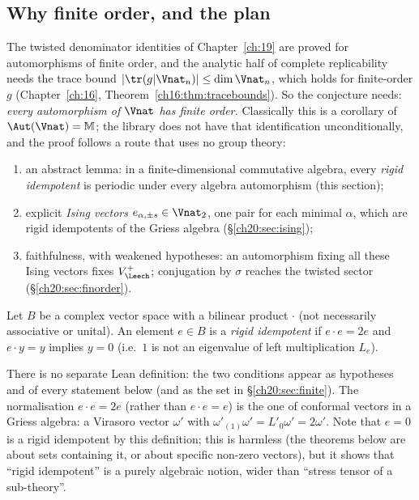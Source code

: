 \subsection{Why finite order, and the plan}

The twisted denominator identities of Chapter~\ref{ch:19} are proved for automorphisms of finite order, and the
analytic half of complete replicability needs the trace bound $|\tr(g|\Vnat_n)|\le\dim\Vnat_n$, which holds for
finite-order $g$ (Chapter~\ref{ch:16}, Theorem~\ref{ch16:thm:tracebounds}).  So the conjecture needs: \emph{every
automorphism of $\Vnat$ has finite order.}  Classically this is a corollary of $\Aut(\Vnat)=\mathbb M$; the library
does not have that identification unconditionally, and the proof follows a route that uses no group theory:
\begin{enumerate}[label=(\arabic*)]
\item an abstract lemma: in a finite-dimensional commutative algebra, every \emph{rigid idempotent} is periodic under
  every algebra automorphism (this section);
\item explicit \emph{Ising vectors} $e_{\alpha,\pm s}\in\Vnat_2$, one pair for each minimal $\alpha$, which are rigid
  idempotents of the Griess algebra (\S\ref{ch20:sec:ising});
\item faithfulness, with weakened hypotheses: an automorphism fixing all these Ising vectors fixes $\chtwentyVL$; conjugation
  by $\sigma$ reaches the twisted sector (\S\ref{ch20:sec:finorder}).
\end{enumerate}

\begin{definition}\label{ch20:def:rigid}
Let $B$ be a complex vector space with a bilinear product $\cdot$ (not necessarily associative or unital).  An element
$e\in B$ is a \emph{rigid idempotent} if $e\cdot e=2e$ and $e\cdot y=y$ implies $y=0$ (i.e.\ $1$ is not an eigenvalue of
left multiplication $L_e$).
\end{definition}
There is no separate Lean definition: the two conditions appear as hypotheses  and
 of every statement below (and as the set  in
\S\ref{ch20:sec:finite}).  The normalisation $e\cdot e=2e$ (rather than $e\cdot e=e$) is the one of conformal vectors in
a Griess algebra: a Virasoro vector $\omega'$ with $\omega'_{(1)}\omega'=L'_0\omega'=2\omega'$.  Note that $e=0$ is a rigid
idempotent by this definition; this is harmless (the theorems below are about sets containing it, or about specific non-zero
vectors), but it shows that ``rigid idempotent'' is a purely algebraic notion, wider than ``stress tensor of a sub-theory''.

